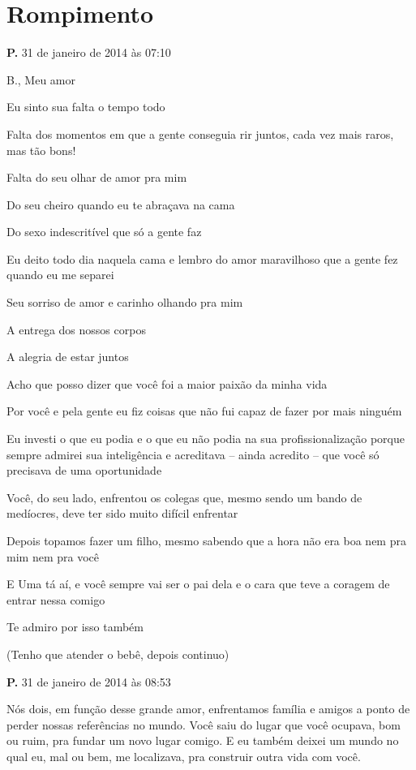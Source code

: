 \chapter{Rompimento}

{\parindent0pt\parskip1pt\raggedright

\textbf{P.} 31 de janeiro de 2014 às 07:10

B., Meu amor

Eu sinto sua falta o tempo todo

Falta dos momentos em que a gente conseguia rir juntos, cada vez mais
raros, mas tão bons!

Falta do seu olhar de amor pra mim

Do seu cheiro quando eu te abraçava na cama

Do sexo indescritível que só a gente faz

Eu deito todo dia naquela cama e lembro do amor maravilhoso que a gente
fez quando eu me separei

Seu sorriso de amor e carinho olhando pra mim

A entrega dos nossos corpos

A alegria de estar juntos

Acho que posso dizer que você foi a maior paixão da minha vida

Por você e pela gente eu fiz coisas que não fui capaz de fazer por mais
ninguém

Eu investi o que eu podia e o que eu não podia na sua profissionalização
porque sempre admirei sua inteligência e acreditava -- ainda acredito --
que você só precisava de uma oportunidade

Você, do seu lado, enfrentou os colegas que, mesmo sendo um bando de
medíocres, deve ter sido muito difícil enfrentar

Depois topamos fazer um filho, mesmo sabendo que a hora não era boa nem
pra mim nem pra você

E Uma tá aí, e você sempre vai ser o pai dela e o cara que teve a
coragem de entrar nessa comigo

Te admiro por isso também

(Tenho que atender o bebê, depois continuo)

\textbf{P.} 31 de janeiro de 2014 às 08:53

Nós dois, em função desse grande amor, enfrentamos família e amigos a
ponto de perder nossas referências no mundo. Você saiu do lugar que você
ocupava, bom ou ruim, pra fundar um novo lugar comigo. E eu também
deixei um mundo no qual eu, mal ou bem, me localizava, pra construir
outra vida com você.

}
